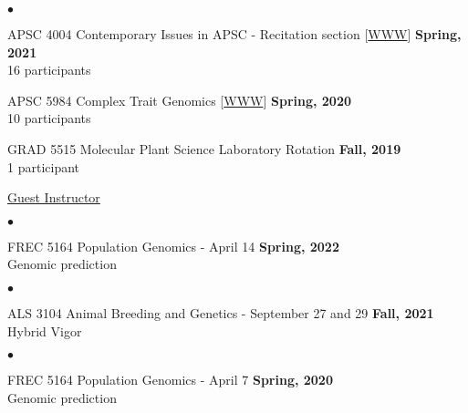 \documentclass[margin,line,10pt]{res}
\newenvironment{list2}{
  \begin{list}{$\bullet$}{%
      \setlength{\itemsep}{0in}
      \setlength{\parsep}{0in} \setlength{\parskip}{0in}
      \setlength{\topsep}{0in} \setlength{\partopsep}{0in} 
      \setlength{\leftmargin}{0.2in}}}{\end{list}}
\begin{document}
\begin{resume}
\begin{list2}
         \vspace{0.5cm}

         
  \item APSC 4004 Contemporary Issues in APSC - Recitation section [\textcolor{blue}{\href{http://morotalab.org/apsc4004-2021/syllabus4004-10730.pdf}{WWW}}] 
  \hfill {\bf Spring, 2021} \\
         16  participants 
  
         \vspace{0.5cm}
         
\item APSC 5984 Complex Trait Genomics [\textcolor{blue}{\href{http://morotalab.org/apsc5984-2020/APSC5984.html}{WWW}}] 
  \hfill {\bf Spring, 2020} \\
         10  participants %
  
     \vspace{0.5cm}

     
\item GRAD 5515 Molecular Plant Science Laboratory Rotation
  \hfill {\bf Fall, 2019} \\
  1 participant

\end{list2}

     \vspace{0.3cm}


\underline{Guest Instructor}



\vspace{0.4cm}
 \begin{list2}
 \item FREC 5164 Population Genomics - April 14  \hfill {\bf Spring, 2022} \\
   Genomic prediction
\end{list2}


\vspace{0.4cm}
 \begin{list2}
 \item ALS 3104 Animal Breeding and Genetics  - September 27 and 29  \hfill {\bf Fall, 2021} \\
   Hybrid Vigor 
\end{list2}

  \vspace{0.3cm}

 
\vspace{0.4cm}
 \begin{list2}
 \item FREC 5164 Population Genomics - April 7  \hfill {\bf Spring, 2020} \\
   Genomic prediction
\end{list2}



\end{resume}
\end{document}

